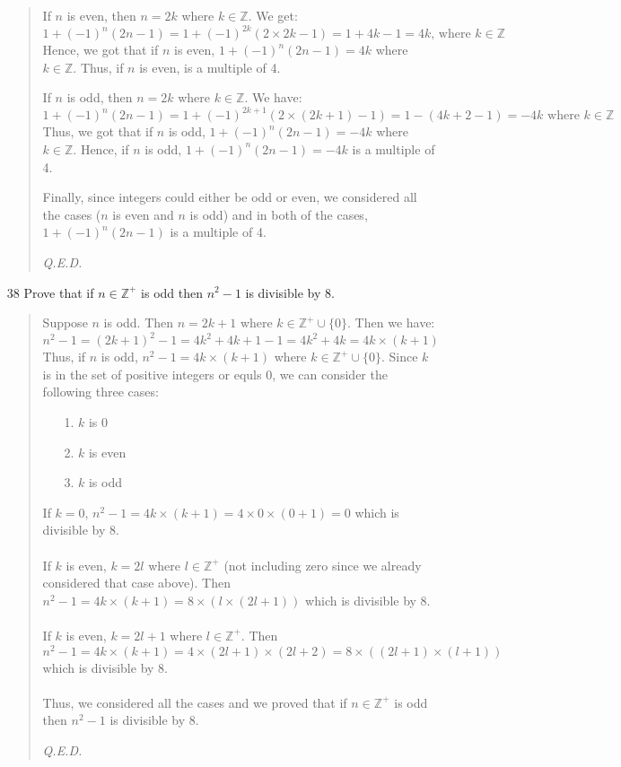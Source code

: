 \documentclass[12pt, a4paper]{article}                      %
\newcommand{\intz}{\mathbb{Z}}
\newcommand{\intzp}{\mathbb{Z^+}}
\begin{document}
\begin{itemize}
\begin{quote}
If $n$ is even, then $n = 2k$ where $k \in \intz$. We get:
$$1 + (-1)^n(2n-1) = 1 + (-1)^{2k}(2 \times 2k-1) = 1 + 4k - 1 = 4k \mbox{, where } k \in \intz$$
Hence, we got that if $n$ is even, $1 + (-1)^n(2n-1) = 4k$ where $k \in \intz$. Thus, if $n$ is even,
is a multiple of 4.

If $n$ is odd, then $n = 2k$ where $k \in \intz$. We have:
$$1 + (-1)^n(2n-1) = 1 + (-1)^{2k+1}(2 \times (2k + 1)-1) = 1  - (4k + 2 - 1) = -4k \mbox{ where } k \in \intz$$
Thus, we got that if $n$ is odd, $1 + (-1)^n(2n-1) = -4k$ where $k \in \intz$. Hence, if $n$ is odd,
$1 + (-1)^n(2n-1) = -4k$ is a multiple of 4.

Finally, since integers could either be odd or even, we considered all the cases ($n$ is even and $n$ is odd) and in
both of the cases, $1 + (-1)^n(2n-1)$ is a multiple of 4.
\begin{flushright}
\textit{Q.E.D.}
\end{flushright}
\end{quote}

\item[38]
Prove that if $n \in \intzp$ is odd then $n^2 - 1$ is divisible by 8.
\begin{quote}
Suppose $n$ is odd. Then $n = 2k + 1$ where $k \in \intzp \cup \{0\}$.
Then we have:
$$n^2 - 1 = (2k + 1)^2 - 1 = 4k^2 + 4k + 1 - 1 = 4k^2 + 4k = 4k \times (k + 1)$$
Thus, if $n$ is odd, $n^2 - 1 = 4k \times (k + 1)$ where $k \in \intzp \cup \{0\}$.
Since $k$ is in the set of positive integers or equls 0, we can consider the following
three cases:
\begin{itemize}
\item[1.]
$k$ is 0
\item[2.]
$k$ is even
\item[3.]
$k$ is odd\\
\end{itemize}
If $k = 0$, $n^2 - 1 = 4k \times (k + 1) = 4 \times 0 \times (0 + 1) = 0$ which is divisible by 8.
\\\\
If $k$ is even, $k = 2l$ where $l \in \intzp$ (not including zero since we already considered that case above).
Then $n^2 - 1 = 4k \times (k + 1) = 8 \times (l \times (2l + 1))$ which is divisible by 8.
\\\\
If $k$ is even, $k = 2l + 1$ where $l \in \intzp$.
Then $n^2 - 1 = 4k \times (k + 1) = 4 \times (2l + 1) \times (2l + 2) = 8 \times ((2l + 1) \times (l + 1))$ which
is divisible by 8.
\\\\
Thus, we considered all the cases and we proved that if $n \in \intzp$ is odd then $n^2 - 1$ is divisible by 8.
\begin{flushright}
\textit{Q.E.D.}
\end{flushright}
\end{quote}


\end{itemize}
\end{document}
